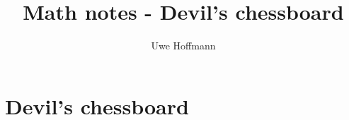 

\title{Math notes - Devil's chessboard}
\author{Uwe Hoffmann}



\setcounter{chapter}{1}
\chapter*{Devil's chessboard}
